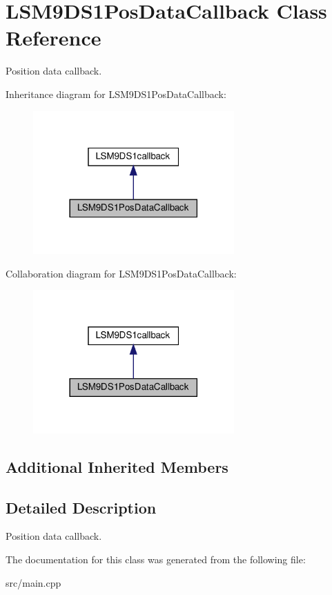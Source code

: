 \hypertarget{classLSM9DS1PosDataCallback}{}\section{L\+S\+M9\+D\+S1\+Pos\+Data\+Callback Class Reference}
\label{classLSM9DS1PosDataCallback}


Position data callback.  




Inheritance diagram for L\+S\+M9\+D\+S1\+Pos\+Data\+Callback\+:
\nopagebreak
\begin{figure}[H]
\begin{center}
\leavevmode
\includegraphics[width=218pt]{classLSM9DS1PosDataCallback__inherit__graph}
\end{center}
\end{figure}


Collaboration diagram for L\+S\+M9\+D\+S1\+Pos\+Data\+Callback\+:
\nopagebreak
\begin{figure}[H]
\begin{center}
\leavevmode
\includegraphics[width=218pt]{classLSM9DS1PosDataCallback__coll__graph}
\end{center}
\end{figure}
\subsection*{Additional Inherited Members}


\subsection{Detailed Description}
Position data callback. 

The documentation for this class was generated from the following file\+:\begin{DoxyCompactItemize}
\item 
src/main.\+cpp\end{DoxyCompactItemize}
